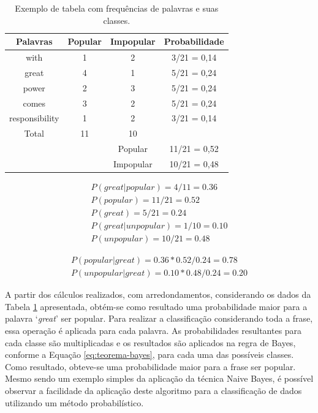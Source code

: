 \documentclass[oneside,openright,12pt]{ufsm_2015} %
\begin{document}
    \begin{table}[ht]
        \caption{Exemplo de tabela com frequências de palavras e suas classes.}
        \centering
        \begin{tabular}{ c c c c }
            \hline
            Palavras & Popular & Impopular & Probabilidade \\
            \hline
            with & 1 & 2 & 3/21 = 0,14 \\
            great & 4 & 1 & 5/21 = 0,24 \\
            power & 2 & 3 & 5/21 = 0,24 \\
            comes & 3 & 2 & 5/21 = 0,24 \\
            responsibility & 1 & 2 & 3/21 = 0,14 \\
            \hline
            Total & 11 & 10 & \\
            \hline
            & & Popular & 11/21 = 0,52 \\
            & & Impopular & 10/21 = 0,48 \\
            \hline
        \end{tabular}
        \vspace{\baselineskip} %
        \label{tab:naive-freq}
    \end{table}
    
    \begin{align}
    P(great|popular) = 4/11 = 0.36 \\
    P(popular) = 11/21 = 0.52 \\
    P(great) = 5/21 = 0.24 \\
    P(great|unpopular) = 1/10 = 0.10 \\
    P(unpopular) = 10/21 = 0.48
    \end{align}
    
    \begin{align}
    P(popular|great) = 0.36 * 0.52 / 0.24 = 0.78 \\
    P(unpopular|great) = 0.10 * 0.48 / 0.24 = 0.20
    \end{align}
    
    \par A partir dos cálculos realizados, com arredondamentos, considerando os dados da Tabela \ref{tab:naive-freq} apresentada, obtém-se como resultado uma probabilidade maior para a palavra `\textit{great}' ser popular. Para realizar a classificação considerando toda a frase, essa operação é aplicada para cada palavra. As probabilidades resultantes para cada classe são multiplicadas e os resultados são aplicados na regra de Bayes, conforme a Equação \ref{eq:teorema-bayes}, para cada uma das possíveis classes. Como resultado, obteve-se uma probabilidade maior para a frase ser popular. Mesmo sendo um exemplo simples da aplicação da técnica Naive Bayes, é possível observar a facilidade da aplicação deste algoritmo para a classificação de dados utilizando um método probabilístico.
\end{document}

